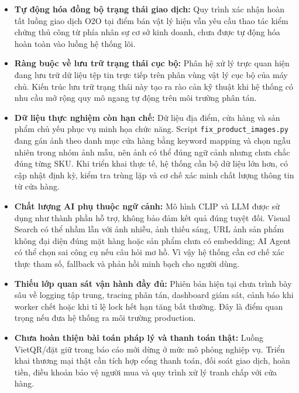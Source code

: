 \documentclass[12pt, a4paper]{article}
\begin{document}
\begin{itemize}
    \item \textbf{Tự động hóa đồng bộ trạng thái giao dịch:} Quy trình xác nhận hoàn tất luồng giao dịch O2O tại điểm bán vật lý hiện vẫn yêu cầu thao tác kiểm chứng thủ công từ phía nhân sự cơ sở kinh doanh, chưa được tự động hóa hoàn toàn vào luồng hệ thống lõi.
    
    \item \textbf{Ràng buộc về lưu trữ trạng thái cục bộ:} Phân hệ xử lý trực quan hiện đang lưu trữ dữ liệu tệp tin trực tiếp trên phân vùng vật lý cục bộ của máy chủ. Kiến trúc lưu trữ trạng thái này tạo ra rào cản kỹ thuật khi hệ thống có nhu cầu mở rộng quy mô ngang tự động trên môi trường phân tán.

    \item \textbf{Dữ liệu thực nghiệm còn hạn chế:} Dữ liệu địa điểm, cửa hàng và sản phẩm chủ yếu phục vụ minh họa chức năng. Script \texttt{fix\_product\_images.py} đang gán ảnh theo danh mục cửa hàng bằng keyword mapping và chọn ngẫu nhiên trong nhóm ảnh mẫu, nên ảnh có thể đúng ngữ cảnh nhưng chưa chắc đúng từng SKU. Khi triển khai thực tế, hệ thống cần bộ dữ liệu lớn hơn, có cập nhật định kỳ, kiểm tra trùng lặp và cơ chế xác minh chất lượng thông tin từ cửa hàng.

    \item \textbf{Chất lượng AI phụ thuộc ngữ cảnh:} Mô hình CLIP và LLM được sử dụng như thành phần hỗ trợ, không bảo đảm kết quả đúng tuyệt đối. Visual Search có thể nhầm lẫn với ảnh nhiễu, ảnh thiếu sáng, URL ảnh sản phẩm không đại diện đúng mặt hàng hoặc sản phẩm chưa có embedding; AI Agent có thể chọn sai công cụ nếu câu hỏi mơ hồ. Vì vậy hệ thống cần cơ chế xác thực tham số, fallback và phản hồi minh bạch cho người dùng.

    \item \textbf{Thiếu lớp quan sát vận hành đầy đủ:} Phiên bản hiện tại chưa trình bày sâu về logging tập trung, tracing phân tán, dashboard giám sát, cảnh báo khi worker chết hoặc khi tỉ lệ lock hết hạn tăng bất thường. Đây là điểm quan trọng nếu đưa hệ thống ra môi trường production.

    \item \textbf{Chưa hoàn thiện bài toán pháp lý và thanh toán thật:} Luồng VietQR/đặt giữ trong báo cáo mới dừng ở mức mô phỏng nghiệp vụ. Triển khai thương mại thật cần tích hợp cổng thanh toán, đối soát giao dịch, hoàn tiền, điều khoản bảo vệ người mua và quy trình xử lý tranh chấp với cửa hàng.
\end{itemize}
\end{document}
